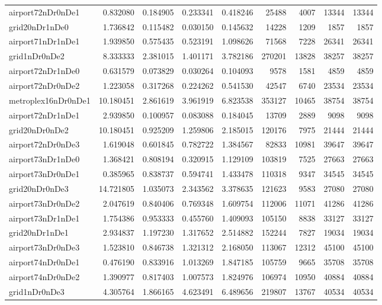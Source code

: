 \begin{longtable}{|l|r|r|r|r|r|r|r|r|}
airport72nDr0nDe1 & 0.832080 & 0.184905 & 0.233341 & 0.418246 & 25488 & 4007 & 13344 & 13344 \\
grid20nDr1nDe0 & 1.736842 & 0.115482 & 0.030150 & 0.145632 & 14228 & 1209 & 1857 & 1857 \\
airport71nDr1nDe1 & 1.939850 & 0.575435 & 0.523191 & 1.098626 & 71568 & 7228 & 26341 & 26341 \\
grid1nDr0nDe2 & 8.333333 & 2.381015 & 1.401171 & 3.782186 & 270201 & 13828 & 38257 & 38257 \\
airport72nDr1nDe0 & 0.631579 & 0.073829 & 0.030264 & 0.104093 & 9578 & 1581 & 4859 & 4859 \\
airport72nDr0nDe2 & 1.223058 & 0.317268 & 0.224262 & 0.541530 & 42547 & 6740 & 23534 & 23534 \\
metroplex16nDr0nDe1 & 10.180451 & 2.861619 & 3.961919 & 6.823538 & 353127 & 10465 & 38754 & 38754 \\
airport72nDr1nDe1 & 2.939850 & 0.100957 & 0.083088 & 0.184045 & 13709 & 2889 & 9098 & 9098 \\
grid20nDr0nDe2 & 10.180451 & 0.925209 & 1.259806 & 2.185015 & 120176 & 7975 & 21444 & 21444 \\
airport72nDr0nDe3 & 1.619048 & 0.601845 & 0.782722 & 1.384567 & 82833 & 10981 & 39647 & 39647 \\
airport73nDr1nDe0 & 1.368421 & 0.808194 & 0.320915 & 1.129109 & 103819 & 7525 & 27663 & 27663 \\
airport73nDr0nDe1 & 0.385965 & 0.838737 & 0.594741 & 1.433478 & 110318 & 9347 & 34545 & 34545 \\
grid20nDr0nDe3 & 14.721805 & 1.035073 & 2.343562 & 3.378635 & 121623 & 9583 & 27080 & 27080 \\
airport73nDr0nDe2 & 2.047619 & 0.840406 & 0.769348 & 1.609754 & 112006 & 11071 & 41286 & 41286 \\
airport73nDr1nDe1 & 1.754386 & 0.953333 & 0.455760 & 1.409093 & 105150 & 8838 & 33127 & 33127 \\
grid20nDr1nDe1 & 2.934837 & 1.197230 & 1.317652 & 2.514882 & 152244 & 7827 & 19034 & 19034 \\
airport73nDr0nDe3 & 1.523810 & 0.846738 & 1.321312 & 2.168050 & 113067 & 12312 & 45100 & 45100 \\
airport74nDr0nDe1 & 0.476190 & 0.833916 & 1.013269 & 1.847185 & 105759 & 9665 & 35708 & 35708 \\
airport74nDr0nDe2 & 1.390977 & 0.817403 & 1.007573 & 1.824976 & 106974 & 10950 & 40884 & 40884 \\
grid1nDr0nDe3 & 4.305764 & 1.866165 & 4.623491 & 6.489656 & 219807 & 13767 & 40534 & 40534 \\

\end{longtable}
